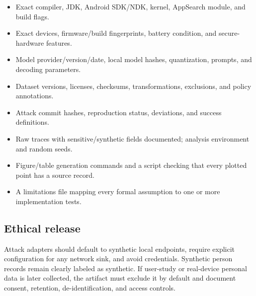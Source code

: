 \begin{itemize}[leftmargin=*]
  \item Exact compiler, JDK, Android SDK/NDK, kernel, AppSearch module, and build flags.
  \item Exact devices, firmware/build fingerprints, battery condition, and secure-hardware features.
  \item Model provider/version/date, local model hashes, quantization, prompts, and decoding parameters.
  \item Dataset versions, licenses, checksums, transformations, exclusions, and policy annotations.
  \item Attack commit hashes, reproduction status, deviations, and success definitions.
  \item Raw traces with sensitive/synthetic fields documented; analysis environment and random seeds.
  \item Figure/table generation commands and a script checking that every plotted point has a source record.
  \item A limitations file mapping every formal assumption to one or more implementation tests.
\end{itemize}

\subsection{Ethical release}

Attack adapters should default to synthetic local endpoints, require explicit configuration for any network sink, and avoid credentials. Synthetic person records remain clearly labeled as synthetic. If user-study or real-device personal data is later collected, the artifact must exclude it by default and document consent, retention, de-identification, and access controls.
